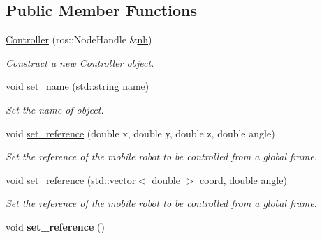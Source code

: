 \subsection*{Public Member Functions}
\begin{DoxyCompactItemize}
\item 
\hyperlink{classController_a7341f9092e1977cdd2a1492c4422c019}{Controller} (ros\+::\+Node\+Handle \&\hyperlink{classController_a24e3d3c2536f6ed29018bad1fd53dae2}{nh})
\begin{DoxyCompactList}\small\item\em Construct a new \hyperlink{classController}{Controller} object. \end{DoxyCompactList}\item 
void \hyperlink{classController_a88f2d54fedd04bd767e4d6e36e6dc2b3}{set\+\_\+name} (std\+::string \hyperlink{classController_af81f22d8b64d915769acfb8e8d89e0c8}{name})
\begin{DoxyCompactList}\small\item\em Set the name of object. \end{DoxyCompactList}\item 
void \hyperlink{classController_ade57ae23226a7565521694c87ec79c90}{set\+\_\+reference} (double x, double y, double z, double angle)
\begin{DoxyCompactList}\small\item\em Set the reference of the mobile robot to be controlled from a global frame. \end{DoxyCompactList}\item 
void \hyperlink{classController_aefad16ae5d5df8baac0ed044018eb6c6}{set\+\_\+reference} (std\+::vector$<$ double $>$ coord, double angle)
\begin{DoxyCompactList}\small\item\em Set the reference of the mobile robot to be controlled from a global frame. \end{DoxyCompactList}\item 
void {\bfseries set\+\_\+reference} ()\hypertarget{classController_a3a417d33a8ecc6e83f3c43e3a4da74cd}{}\label{classController_a3a417d33a8ecc6e83f3c43e3a4da74cd}


\end{DoxyCompactItemize}
